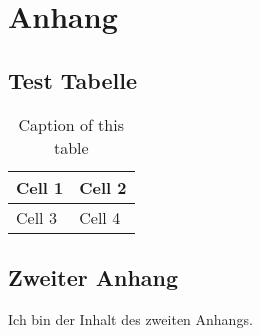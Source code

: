 \section{Anhang}

\subsection{Test Tabelle}
\begin{table}[h!]
\centering
    \begin{tabular}{l | l}
        Cell 1 & Cell 2 \\ \hline
        Cell 3 & Cell 4
    \end{tabular}
    \caption{Caption of this table}%
    \label{app:firstappendix}   
\end{table}

\subsection{Zweiter Anhang}%
\label{app:secondappendix}

Ich bin der Inhalt des zweiten Anhangs.
